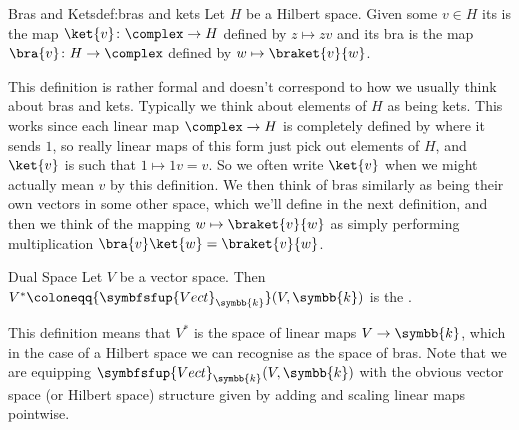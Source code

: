 \documentclass[fleqn]{NotesClass}
\makeatletter
\newcommand{\c@egory}[1]{\symbfsfup{#1}}
\renewcommand{\field}{\symbb{k}}
\newcommand{\Vect}[1][\field]{{\c@egory{Vect}_{#1}}}
\makeatother
\begin{document}
    \begin{dfn}{Bras and Kets}{def:bras and kets}
        Let \(H\) be a Hilbert space.
        Given some \(v \in H\) its  is the map \(\ket{v} \colon \complex \to H\) defined by \(z \mapsto zv\) and its bra is the map \(\bra{v} \colon H \to \complex\) defined by \(w \mapsto \braket{v}{w}\).
    \end{dfn}
    
    This definition is rather formal and doesn't correspond to how we usually think about bras and kets.
    Typically we think about elements of \(H\) as being kets.
    This works since each linear map \(\complex \to H\) is completely defined by where it sends \(1\), so really linear maps of this form just pick out elements of \(H\), and \(\ket{v}\) is such that \(1 \mapsto 1v = v\).
    So we often write \(\ket{v}\) when we might actually mean \(v\) by this definition.
    We then think of bras similarly as being their own vectors in some other space, which we'll define in the next definition, and then we think of the mapping \(w \mapsto \braket{v}{w}\) as simply performing multiplication \(\bra{v} \ket{w} = \braket{v}{w}\).
    
    \begin{dfn}{Dual Space}{}
        Let \(V\) be a vector space.
        Then \(V^* \coloneqq \Vect(V, \field)\) is the .
    \end{dfn}
    
    This definition means that \(V^*\) is the space of linear maps \(V \to \field\), which in the case of a Hilbert space we can recognise as the space of bras.
    Note that we are equipping \(\Vect(V, \field)\) with the obvious vector space (or Hilbert space) structure given by adding and scaling linear maps pointwise.
    
    
\end{document}
